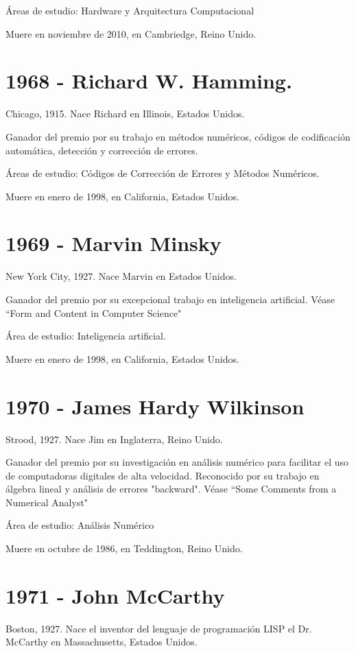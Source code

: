 \documentclass[notitlepage,letterpaper, 11pt]{article}
\begin{document}
\noindent Áreas de estudio: Hardware y Arquitectura Computacional

\noindent Muere en noviembre de 2010, en Cambriedge, Reino Unido.
\newline

\section*{1968 - Richard W. Hamming.}
\noindent Chicago, 1915. Nace Richard en Illinois, Estados Unidos.

\noindent Ganador del premio por su trabajo en métodos numéricos, códigos de codificación automática, detección y corrección de errores. 

\noindent Áreas de estudio: Códigos de Corrección de Errores y Métodos Numéricos.

\noindent Muere en enero de 1998, en California, Estados Unidos.
\newline


\section*{1969 - Marvin Minsky}
\noindent New York City, 1927. Nace Marvin en Estados Unidos.

\noindent Ganador del premio por su excepcional trabajo en inteligencia artificial. Véase ``Form and Content in Computer Science"

\noindent Área de estudio: Inteligencia artificial.

\noindent Muere en enero de 1998, en California, Estados Unidos.
\newline


\section*{1970 - James Hardy Wilkinson}
\noindent Strood, 1927. Nace Jim en Inglaterra, Reino Unido.

\noindent Ganador del premio por su investigación en análisis numérico para facilitar el uso de computadoras digitales de alta velocidad. Reconocido por su trabajo en álgebra lineal y análisis de errores "backward". Véase ``Some Comments from a Numerical Analyst"

\noindent Área de estudio: Análisis Numérico

\noindent Muere en octubre de 1986, en Teddington, Reino Unido.
\newline

\section*{1971 - John McCarthy}
\noindent Boston, 1927. Nace el inventor del lenguaje de programación LISP el Dr. McCarthy en Massachusetts, Estados Unidos.
\end{document}
